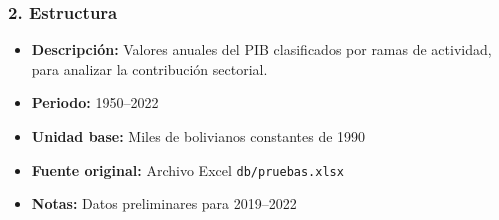 \documentclass[12pt,a4paper]{article}
\begin{document}
\subsubsection*{2. Estructura}
\begin{itemize}
  \item \textbf{Descripción:} Valores anuales del PIB clasificados por ramas de actividad, para analizar la contribución sectorial.
  \item \textbf{Periodo:} 1950--2022
  \item \textbf{Unidad base:} Miles de bolivianos constantes de 1990
  \item \textbf{Fuente original:} Archivo Excel \texttt{db/pruebas.xlsx}
  \item \textbf{Notas:} Datos preliminares para 2019–2022
\end{itemize}
\end{document}
